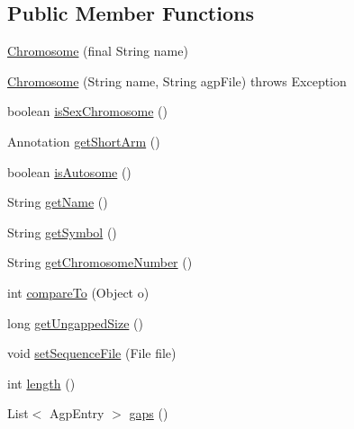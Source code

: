 \subsection*{Public Member Functions}
\begin{DoxyCompactItemize}
\item 
\hyperlink{classbroad_1_1pda_1_1feature_1_1genome_1_1_chromosome_ac74a37214e3862e5328bad5936f7fa96}{Chromosome} (final String name)
\item 
\hyperlink{classbroad_1_1pda_1_1feature_1_1genome_1_1_chromosome_ac2cef93e257072afecedd00560e4a1ad}{Chromosome} (String name, String agp\+File)  throws Exception 
\item 
boolean \hyperlink{classbroad_1_1pda_1_1feature_1_1genome_1_1_chromosome_accc45482f6ba9bda822257886fe17e9f}{is\+Sex\+Chromosome} ()
\item 
Annotation \hyperlink{classbroad_1_1pda_1_1feature_1_1genome_1_1_chromosome_a520a5c2b9095f3aa4079c6992bce443c}{get\+Short\+Arm} ()
\item 
boolean \hyperlink{classbroad_1_1pda_1_1feature_1_1genome_1_1_chromosome_a4a192f9d0d97bfac746fd85d42af4507}{is\+Autosome} ()
\item 
String \hyperlink{classbroad_1_1pda_1_1feature_1_1genome_1_1_chromosome_ad3469d02b22deddedb0d3b6205c1797a}{get\+Name} ()
\item 
String \hyperlink{classbroad_1_1pda_1_1feature_1_1genome_1_1_chromosome_a8600a6e4cefcd5e4d70a1ea20987d370}{get\+Symbol} ()
\item 
String \hyperlink{classbroad_1_1pda_1_1feature_1_1genome_1_1_chromosome_ac46b99bc0b629718335526ac89002f86}{get\+Chromosome\+Number} ()
\item 
int \hyperlink{classbroad_1_1pda_1_1feature_1_1genome_1_1_chromosome_af500375109a20373d852e86fd8c5ed75}{compare\+To} (Object o)
\item 
long \hyperlink{classbroad_1_1pda_1_1feature_1_1genome_1_1_chromosome_a226357672815a362698eee421cf21a2e}{get\+Ungapped\+Size} ()
\item 
void \hyperlink{classbroad_1_1pda_1_1feature_1_1genome_1_1_chromosome_a51712489c54a80d7a571ff99112db94f}{set\+Sequence\+File} (File file)
\item 
int \hyperlink{classbroad_1_1pda_1_1feature_1_1genome_1_1_chromosome_af6f135dae1745340024d4d9d38921b61}{length} ()
\item 
List$<$ Agp\+Entry $>$ \hyperlink{classbroad_1_1pda_1_1feature_1_1genome_1_1_chromosome_a21507b12eda19aa0795eb32013a276da}{gaps} ()
\item 

\end{DoxyCompactItemize}
